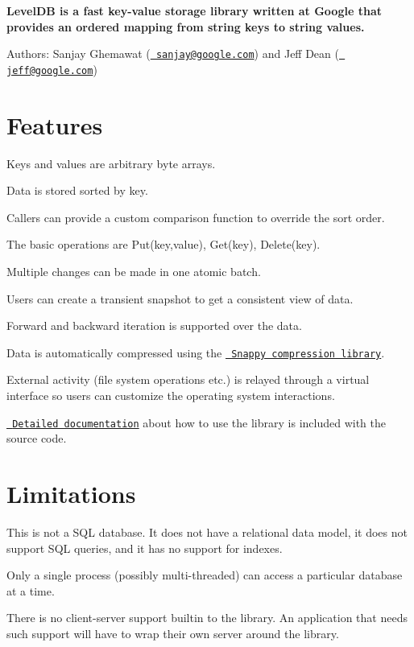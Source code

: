 {\bfseries{Level\+DB is a fast key-\/value storage library written at Google that provides an ordered mapping from string keys to string values.}}

Authors\+: Sanjay Ghemawat (\href{mailto:sanjay@google.com}{\texttt{ sanjay@google.\+com}}) and Jeff Dean (\href{mailto:jeff@google.com}{\texttt{ jeff@google.\+com}})

\section*{Features}


\begin{DoxyItemize}
\item Keys and values are arbitrary byte arrays.
\item Data is stored sorted by key.
\item Callers can provide a custom comparison function to override the sort order.
\item The basic operations are {\ttfamily Put(key,value)}, {\ttfamily Get(key)}, {\ttfamily Delete(key)}.
\item Multiple changes can be made in one atomic batch.
\item Users can create a transient snapshot to get a consistent view of data.
\item Forward and backward iteration is supported over the data.
\item Data is automatically compressed using the \href{http://code.google.com/p/snappy}{\texttt{ Snappy compression library}}.
\item External activity (file system operations etc.) is relayed through a virtual interface so users can customize the operating system interactions.
\item \href{http://htmlpreview.github.io/?https://github.com/google/leveldb/blob/master/doc/index.html}{\texttt{ Detailed documentation}} about how to use the library is included with the source code.
\end{DoxyItemize}

\section*{Limitations}


\begin{DoxyItemize}
\item This is not a S\+QL database. It does not have a relational data model, it does not support S\+QL queries, and it has no support for indexes.
\item Only a single process (possibly multi-\/threaded) can access a particular database at a time.
\item There is no client-\/server support builtin to the library. An application that needs such support will have to wrap their own server around the library.
\end{DoxyItemize}

